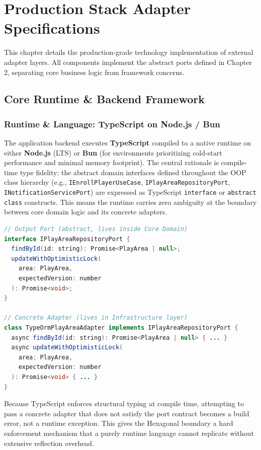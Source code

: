 \documentclass[11pt,a4paper]{report}
\begin{document}
\chapter{Production Stack Adapter Specifications}

This chapter details the production-grade technology implementation of external adapter layers. All components implement the abstract ports defined in Chapter 2, separating core business logic from framework concerns.

\section{Core Runtime \& Backend Framework}

\subsection{Runtime \& Language: TypeScript on Node.js / Bun}

The application backend executes \textbf{TypeScript} compiled to a native runtime on either \textbf{Node.js} (LTS) or \textbf{Bun} (for environments prioritizing cold-start performance and minimal memory footprint). The central rationale is compile-time type fidelity: the abstract domain interfaces defined throughout the OOP class hierarchy (e.g., \texttt{IEnrollPlayerUseCase}, \texttt{IPlayAreaRepositoryPort}, \texttt{INotificationServicePort}) are expressed as TypeScript \texttt{interface} or \texttt{abstract class} constructs. This means the runtime carries zero ambiguity at the boundary between core domain logic and its concrete adapters.

\begin{lstlisting}[language=Java, caption={TypeScript abstract port interface mapping}]
// Output Port (abstract, lives inside Core Domain)
interface IPlayAreaRepositoryPort {
  findById(id: string): Promise<PlayArea | null>;
  updateWithOptimisticLock(
    area: PlayArea,
    expectedVersion: number
  ): Promise<void>;
}

// Concrete Adapter (lives in Infrastructure layer)
class TypeOrmPlayAreaAdapter implements IPlayAreaRepositoryPort {
  async findById(id: string): Promise<PlayArea | null> { ... }
  async updateWithOptimisticLock(
    area: PlayArea,
    expectedVersion: number
  ): Promise<void> { ... }
}
\end{lstlisting}

Because TypeScript enforces structural typing at compile time, attempting to pass a concrete adapter that does not satisfy the port contract becomes a build error, not a runtime exception. This gives the Hexagonal boundary a hard enforcement mechanism that a purely runtime language cannot replicate without extensive reflection overhead.
\end{document}
